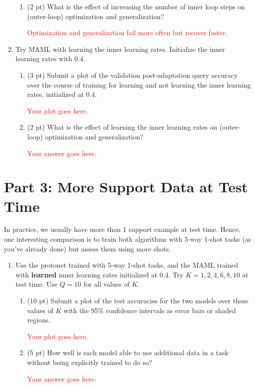 \documentclass[12pt]{article}
\begin{document}
\begin{enumerate}
\begin{enumerate}[label=(\alph*)]
        \item (2 pt) What is the effect of increasing the number of inner loop steps on (outer-loop) optimization and generalization?
        
        \textcolor{red}{Optimization and generalization fail more often but recover faster.}

    \end{enumerate}

    \newpage
    \item Try MAML with learning the inner learning rates. Initialize the inner learning rates with $0.4$.
    \begin{enumerate}[label=(\alph*)]
        \item (3 pt) Submit a plot of the validation post-adaptation query accuracy over the course of training for learning and not learning the inner learning rates, initialized at $0.4$. 

        \textcolor{red}{Your plot goes here.}

        \item (2 pt) What is the effect of learning the inner learning rates on (outer-loop) optimization and generalization?

        \textcolor{red}{Your answer goes here.}

    \end{enumerate}
\end{enumerate}

\newpage
\section*{Part 3: More Support Data at Test Time}

In practice, we usually have more than 1 support example at test time. Hence, one interesting comparison is to train both algorithms with $5$-way $1$-shot tasks (as you've already done) but assess them using more shots.

\begin{enumerate}
    \item Use the protonet trained with 5-way 1-shot tasks, and the MAML trained with \textbf{learned} inner learning rates initialized at 0.4. Try $K = 1, 2, 4, 6, 8, 10$ at test time. Use $Q = 10$ for all values of $K$. 
    \begin{enumerate}
        \item (10 pt) Submit a plot of the test accuracies for the two models over these values of $K$ with the 95\% confidence intervals as error bars or shaded regions. 

        \textcolor{red}{Your plot goes here.}

        
        \item (5 pt) How well is each model able to use additional data in a task without being explicitly trained to do so?

        \textcolor{red}{Your answer goes here.}

    \end{enumerate}
\end{enumerate}
\end{document}
